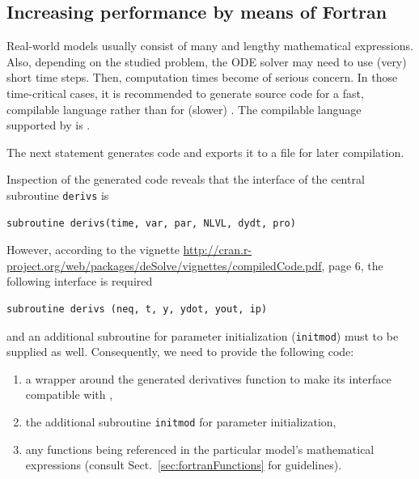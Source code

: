 \documentclass[times,onecolumn]{article}
\begin{document}

\subsection{Increasing performance by means of Fortran} \label{sec:advanced:fortran}

Real-world models usually consist of many and lengthy mathematical expressions. Also, depending on the studied problem, the ODE solver may need to use (very) short time steps. Then, computation times become of serious concern. In those time-critical cases, it is recommended to generate source code for a fast, compilable language rather than for (slower) . The compilable language supported by  is .

The next statement generates  code and exports it to a file for later compilation.

\begin{Schunk}
\end{Schunk}

Inspection of the generated  code reveals that the interface of the central subroutine \verb|derivs| is

\begin{verbatim}
subroutine derivs(time, var, par, NLVL, dydt, pro)
\end{verbatim}

However, according to the  vignette \url{http://cran.r-project.org/web/packages/deSolve/vignettes/compiledCode.pdf}, page 6, the following interface is required

\begin{verbatim}
subroutine derivs (neq, t, y, ydot, yout, ip)
\end{verbatim}

and an additional subroutine for parameter initialization (\verb|initmod|) must to be supplied as well. Consequently, we need to provide the following  code:

\begin{enumerate}
\item a wrapper around the generated derivatives function to make its interface compatible with ,
\item the additional subroutine \verb|initmod| for parameter initialization,
\item any functions being referenced in the particular model's mathematical expressions (consult Sect.~\ref{sec:fortranFunctions} for guidelines).
\end{enumerate}
\end{document}
